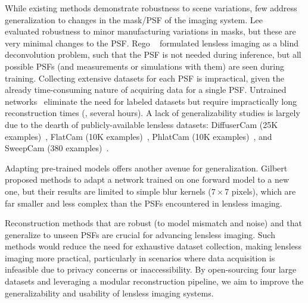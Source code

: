 \noindent While existing methods demonstrate robustness to scene variations,
few address generalization to changes in the mask/PSF of the imaging system.
Lee \etal~\cite{Lee:23} evaluated robustness to minor manufacturing variations in masks,
but these are very minimal changes to the PSF.
Rego \etal~\cite{Rego2021} formulated lensless imaging as a blind deconvolution problem, such that the PSF is not needed during inference, but all possible PSFs (and measurements or simulations with them) are seen during training.
Collecting extensive datasets for each PSF is impractical, given the already time-consuming nature of acquiring data for a single PSF.
Untrained networks~\cite{Monakhova:21} eliminate the need for labeled datasets but require impractically long reconstruction times (\eg, several hours).
A lack of generalizability studies is largely due to the dearth of publicly-available lensless datasets: DiffuserCam (25K examples)~\cite{Monakhova:19}, FlatCam (10K examples)~\cite{9239993}, PhlatCam (10K examples)~\cite{9239993}, and SweepCam (380 examples)~\cite{zheng2021programmable3dcam}.

Adapting pre-trained models offers another avenue for generalization. 
Gilbert \etal~\cite{9477112} proposed methods to adapt a network trained on one forward model to a new one, but their results are limited to simple blur kernels ($7\times7$ pixels), which are far smaller and less complex than the PSFs encountered in lensless imaging.

Reconstruction methods that are robust (to model mismatch and noise) and that generalize to unseen PSFs are crucial for advancing lensless imaging. 
Such methods would reduce the need for exhaustive dataset collection, 
making lensless imaging more practical, 
particularly in scenarios where data acquisition is infeasible due to privacy concerns or inaccessibility. By open-sourcing four large datasets and leveraging a modular reconstruction pipeline, 
we aim to improve the generalizability and usability of lensless imaging systems.
